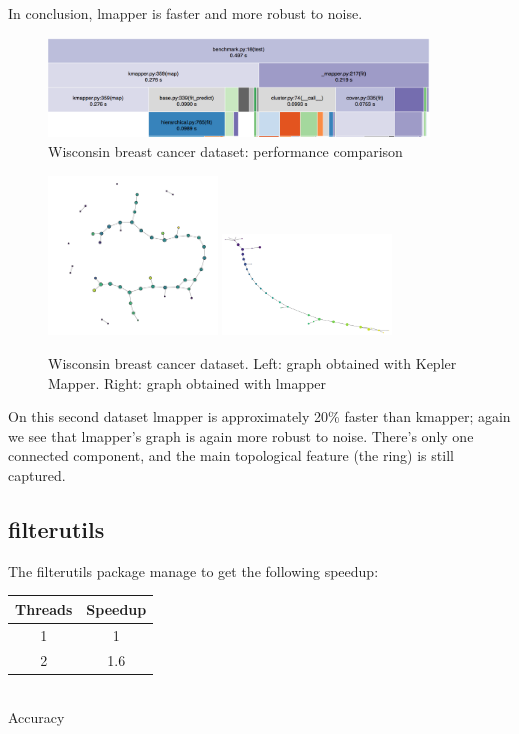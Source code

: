 In conclusion, lmapper is faster and more robust to noise.

\begin{figure}[h]
	\caption{Wisconsin breast cancer dataset: performance comparison}
	\centering
	\includegraphics[width=0.9\textwidth]{images/benchmark/cat/benchmark}
\end{figure}
\begin{figure}[h!]
	\caption{Wisconsin breast cancer dataset. Left: graph obtained with Kepler Mapper. Right: graph obtained with lmapper}
	\centering
	\includegraphics[width=0.4\textwidth]{images/benchmark/cat/benchmark_kmapper}	\includegraphics[width=0.4\textwidth]{images/benchmark/cat/benchmark_lmapper}
\end{figure}

On this second dataset lmapper is approximately 20\% faster than kmapper; again we see that lmapper's graph is again more robust to noise. There's only one connected component, and the main topological feature (the ring) is still captured.

\subsection{filterutils}
The filterutils package manage to get the following speedup:

\begin{center}
	
	\begin{tabular}{ cc } 
		
		Threads & Speedup \\ 
		\hline
		1& 1\\ 
		2 & 1.6 \\ 
	\end{tabular}\\
	\bigskip
	Accuracy
\end{center}

